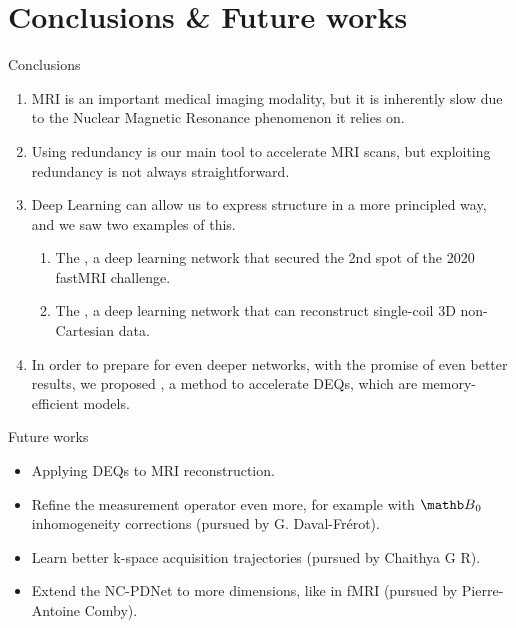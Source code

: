 \documentclass[aspectratio=169,xcolor=dvipsnames]{beamer}
\begin{document}



% 



\section{Conclusions \& Future works}

\begin{frame}{Conclusions}
    \begin{enumerate}[<+->]
        \item MRI is an important medical imaging modality, but it is inherently slow due to the Nuclear Magnetic Resonance phenomenon it relies on.
        \item Using redundancy is our main tool to accelerate MRI scans, but exploiting redundancy is not always straightforward.
        \item Deep Learning can allow us to express structure in a more principled way, and we saw two examples of this.
        \begin{enumerate}[<+->]
            \item The , a deep learning network that secured the 2nd spot of the 2020 fastMRI challenge.
            \item The , a deep learning network that can reconstruct single-coil 3D non-Cartesian data.
        \end{enumerate}
        \item In order to prepare for even deeper networks, with the promise of even better results, we proposed , a method to accelerate DEQs, which are memory-efficient models.
    \end{enumerate}
\end{frame}

\begin{frame}{Future works}
    \begin{itemize}
        \item Applying DEQs to MRI reconstruction.
        \item Refine the measurement operator even more, for example with $\Bb_0$ inhomogeneity corrections (pursued by G. Daval-Fr\'{e}rot).
        \item Learn better k-space acquisition trajectories (pursued by Chaithya G R).
        \item Extend the NC-PDNet to more dimensions, like in fMRI (pursued by Pierre-Antoine Comby).
    \end{itemize}
\end{frame}
\end{document}
